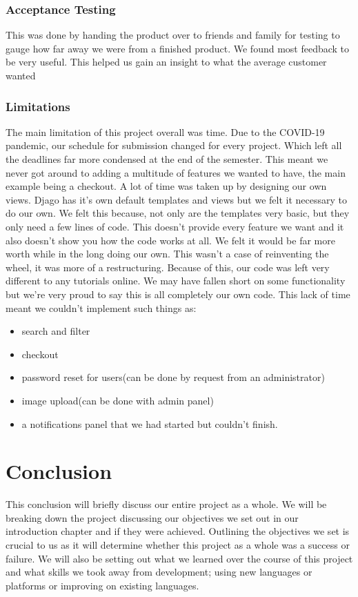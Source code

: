 \subsection{Acceptance Testing}
This was done by handing the product over to friends and family for testing to gauge how far away we were from a finished product. We found most feedback to be very useful. This helped us gain an insight to what the average customer wanted
\subsection{Limitations}
The main limitation of this project overall was time. Due to the COVID-19 pandemic, our schedule for submission changed for every project. Which left all the deadlines far more condensed at the end of the semester. This meant we never got around to adding a multitude of features we wanted to have, the main example being a checkout. A lot of time was taken up by designing our own views. Djago has it's own default templates and views but we felt it necessary to do our own. We felt this because, not only are the templates very basic, but they only need a few lines of code. This doesn't provide every feature we want and it also doesn't show you how the code works at all. We felt it would be far more worth while in the long doing our own. This wasn't a case of reinventing the wheel, it was more of a restructuring. Because of this, our code was left very different to any tutorials online. We may have fallen short on some functionality but we're very proud to say this is all completely our own code. This lack of time meant we couldn't implement such things as:
\begin{itemize}
    \item search and filter
    \item checkout
    \item password reset for users(can be done by request from an administrator)
    \item image upload(can be done with admin panel)
    \item a notifications panel that we had started but couldn't finish.
\end{itemize}

\chapter{Conclusion}
This conclusion will briefly discuss our entire project as a whole. We will be breaking down the project discussing our objectives we set out in our introduction chapter and if they were achieved. Outlining the objectives we set is crucial to us as it will determine whether this project as a whole was a success or failure. We will also be setting out what we learned over the course of this project and what skills we took away from development; using new languages or platforms or improving on existing languages.


